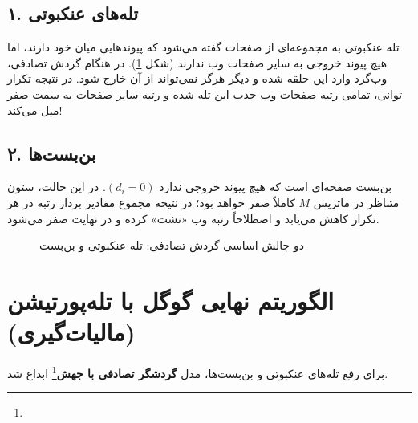 \subsection{۱. تله‌های عنکبوتی \texorpdfstring{}{(Spider Traps)}}
تله عنکبوتی به مجموعه‌ای از صفحات گفته می‌شود که پیوندهایی میان خود دارند، اما هیچ پیوند خروجی به سایر صفحات وب ندارند (شکل \ref{fig:traps}).
در هنگام گردش تصادفی، وب‌گرد وارد این حلقه شده و دیگر هرگز نمی‌تواند از آن خارج شود. در نتیجه تکرار توانی، تمامی رتبه صفحات وب جذب این تله شده و رتبه سایر صفحات به سمت صفر میل می‌کند!

\subsection{۲. بن‌بست‌ها \texorpdfstring{}{(Dead Ends)}}
بن‌بست صفحه‌ای است که هیچ پیوند خروجی ندارد $(d_i = 0)$. در این حالت، ستون متناظر در ماتریس $M$ کاملاً صفر خواهد بود؛ در نتیجه مجموع مقادیر بردار رتبه در هر تکرار کاهش می‌یابد و اصطلاحاً رتبه وب «نشت» کرده و در نهایت صفر می‌شود.

\begin{figure}[H]
\centering
{}
\caption{دو چالش اساسی گردش تصادفی: تله عنکبوتی و بن‌بست}
\label{fig:traps}
\end{figure}

\section{الگوریتم نهایی گوگل با تله‌پورتیشن (مالیات‌گیری)}
برای رفع تله‌های عنکبوتی و بن‌بست‌ها، مدل \textbf{گردشگر تصادفی با جهش}\footnote{} ابداع شد.

